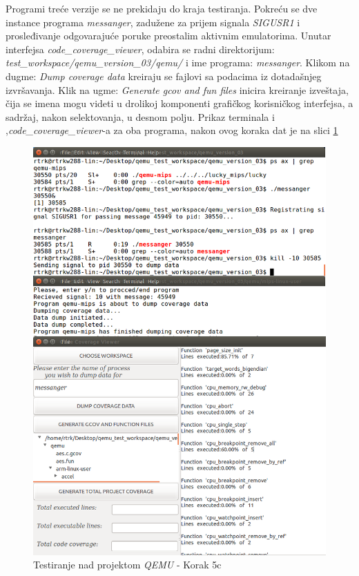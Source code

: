 \documentclass[12pt,oneside]{memoir}
\newcommand{\strano}[1]{\textit{#1}}
\begin{document}
Programi treće verzije se ne prekidaju do kraja testiranja. Pokreću se dve instance programa \strano{messanger}, zadužene za prijem signala \strano{SIGUSR1} i prosleđivanje odgovarajuće poruke preostalim aktivnim emulatorima. Unutar interfejsa \strano{code\_coverage\_viewer}, odabira se radni direktorijum: \\ \strano{test\_workspace/qemu\_version\_03/qemu/} i ime programa: \strano{messanger}. Klikom na dugme: \strano{Dump coverage data} kreiraju se fajlovi sa podacima iz dotadašnjeg izvršavanja. Klik na ugme: \strano{Generate gcov and fun files} inicira kreiranje izveštaja, čija se imena mogu videti u drolikoj komponenti grafičkog korisničkog interfejsa, a sadržaj, nakon selektovanja, u desnom polju. Prikaz terminala i ,\strano{code\_coverage\_viewer}-a za oba programa, nakon ovog koraka dat je na slici \ref{fig:qemu-test-5}

\begin{figure}[!ht]
  \centering
  \includegraphics[width=\textwidth]{img/qemu-test-5-ng.png}
  \caption{Testiranje nad projektom \strano{QEMU} - Korak 5c}
  \label{fig:qemu-test-5}
\end{figure} 
\end{document}
